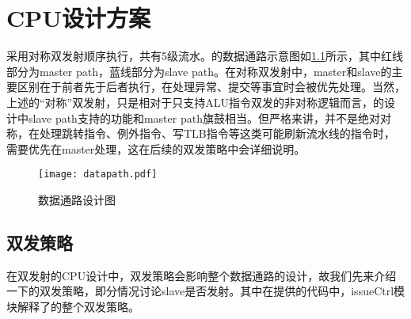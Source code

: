 \chapter{CPU设计方案}

\cpuname 采用对称双发射顺序执行，共有5级流水。\cpuname 的数据通路示意图如\ref{img:datapath}所示，其中红线部分为master path，蓝线部分为slave path。在对称双发射中，master和slave的主要区别在于前者先于后者执行，在处理异常、提交等事宜时会被优先处理。当然，上述的“对称”双发射，只是相对于只支持ALU指令双发的非对称逻辑而言，\cpuname 的设计中slave path支持的功能和master path旗鼓相当。但严格来讲，并不是绝对对称，在处理跳转指令、例外指令、写TLB指令等这类可能刷新流水线的指令时，需要优先在master处理，这在后续的双发策略中会详细说明。

\begin{figure}[h]
    \centering
    \texttt{[image: datapath.pdf]}
    \caption{数据通路设计图}
    \label{img:datapath}
\end{figure}


\section{双发策略}
在双发射的CPU设计中，双发策略会影响整个数据通路的设计，故我们先来介绍一下\cpuname 的双发策略，即分情况讨论slave是否发射。其中在提供的代码中，issueCtrl模块解释了\cpuname 的整个双发策略。

